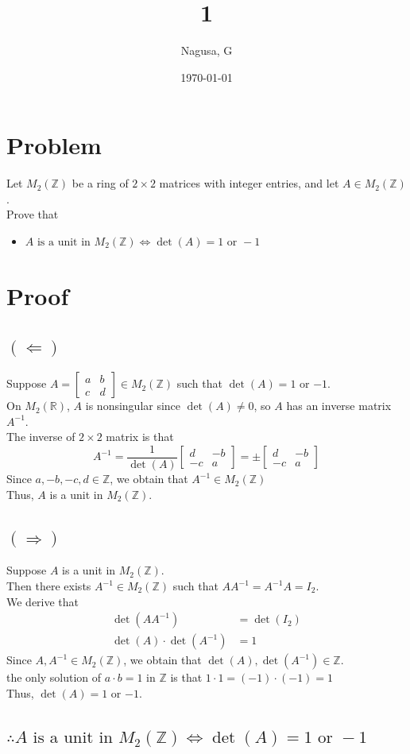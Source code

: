 \documentclass[11pt, a4paper]{article}
\title{1}
\author{Nagusa, G}
\date{\today}
\begin{document}
\maketitle

\section*{Problem}
Let $M_2(\mathbb{Z})$ be a ring of $2\times2$ matrices with integer entries, and let $A\in M_2(\mathbb{Z})$.\\
Prove that 
\begin{itemize}
    \item $A \text{ is a unit in } M_2(\mathbb{Z}) \Longleftrightarrow  \det(A) = 1 \text{ or } -1$
\end{itemize}

\section*{Proof}

\subsection*{$(\Leftarrow)$}
Suppose $A = \begin{bmatrix} a & b \\ c & d \end{bmatrix} \in M_2(\mathbb{Z})$ such that $\det(A) = 1$ or $-1$.\\
On $M_2(\mathbb{R})$, $A$ is nonsingular since $\det(A) \neq 0$, so $A$ has an inverse matrix $A^{-1}$.\\
The inverse of $2\times2$ matrix is that
\[
A^{-1} = \frac{1}{\det(A)} 
\begin{bmatrix}
    d & -b \\
    -c & a
\end{bmatrix}
= \pm
\begin{bmatrix}
    d & -b \\
    -c & a
\end{bmatrix}
\]
Since $a, -b, -c, d \in \mathbb{Z}$, we obtain that $A^{-1} \in M_2(\mathbb{Z})$\\
Thus, $A$ is a unit in $M_2(\mathbb{Z})$.

\subsection*{$(\Rightarrow)$}
Suppose $A$ is a unit in $M_2(\mathbb{Z})$.\\
Then there exists $A^{-1} \in M_2(\mathbb{Z})$ such that $AA^{-1} = A^{-1}A = I_2$.\\
We derive that
\begin{align*}
    \det(AA^{-1}) &= \det(I_2)\\
    \det(A)\cdot \det(A^{-1}) &= 1
\end{align*}
Since $A, A^{-1} \in M_2(\mathbb{Z})$, we obtain that $\det(A), \det(A^{-1}) \in \mathbb{Z}$.\\
the only solution of $a\cdot b=1$ in $\mathbb{Z}$ is that $1\cdot1 = (-1)\cdot(-1) = 1$\\
Thus, $\det(A) = 1$ or $-1$.

\subsection*{$\therefore A \text{ is a unit in } M_2(\mathbb{Z}) \Longleftrightarrow  \det(A) = 1 \text{ or } -1$}
\end{document}
